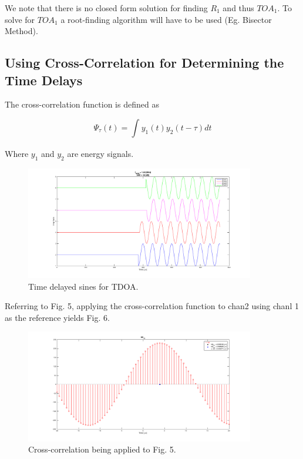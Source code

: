\documentclass[12pt]{article}
\begin{document}
\noindent We note that there is no closed form solution for finding $R_1$ and thus $TOA_1$. To solve for $TOA_1$ a root-finding algorithm will have to be used (Eg. Bisector Method).

\subsection{Using Cross-Correlation for Determining the Time Delays}

\vspace{5 mm}
\noindent The cross-correlation function is defined as
\begin{center}
\begin{equation} \label{eq:29}
\Psi_\tau (t) = \int_{}^{} y_1(t) y_2(t-\tau) dt
\end{equation}
\end{center}

\vspace{5 mm}
\noindent Where $y_1$ and $y_2$ are energy signals.

\begin{figure}[!h]
	\centering
	\includegraphics[width=10.0cm]{Pics_and_Figs/Delayed_Sines_Heads.png}
    \caption{Time delayed sines for TDOA.} \label{fig:Delayed_Sines_Heads}
\end{figure}

\pagebreak
\noindent Referring to Fig. 5, applying the cross-correlation function to chan2 using chanl 1 as the reference yields Fig. 6.

\begin{figure}[!h]
	\centering
	\includegraphics[width=10.0cm]{Pics_and_Figs/XC_Partial_Heads.png}
    \caption{Cross-correlation being applied to Fig. 5.} \label{fig:XC_Partial_Heads}
\end{figure}
\end{document}
